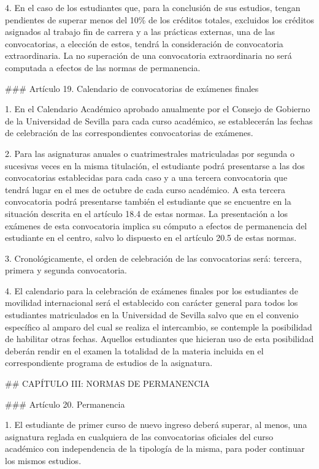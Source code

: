 \documentclass{article}
\begin{document}
\begin{itemize}
\begin{itemize}
\begin{scriptsize}
                  4. En el caso de los estudiantes que, para la conclusión de sus estudios, tengan pendientes de superar menos del 10\% de los créditos totales, excluidos los créditos asignados al trabajo fin de carrera y a las prácticas externas, una de las convocatorias, a elección de estos, tendrá la consideración de convocatoria extraordinaria. La no superación de una convocatoria extraordinaria no será computada a efectos de las normas de permanencia.

                  \#\#\# Artículo 19. Calendario de convocatorias de exámenes finales

                  1. En el Calendario Académico aprobado anualmente por el Consejo de Gobierno de la Universidad de Sevilla para cada curso académico, se establecerán las fechas de celebración de las correspondientes convocatorias de exámenes.

                  2. Para las asignaturas anuales o cuatrimestrales matriculadas por segunda o sucesivas veces en la misma titulación, el estudiante podrá presentarse a las dos convocatorias establecidas para cada caso y a una tercera convocatoria que tendrá lugar en el mes de octubre de cada curso académico. A esta tercera convocatoria podrá presentarse también el estudiante que se encuentre en la situación descrita en el artículo 18.4 de estas normas. La presentación a los exámenes de esta convocatoria implica su cómputo a efectos de permanencia del estudiante en el centro, salvo lo dispuesto en el artículo 20.5 de estas normas.

                  3. Cronológicamente, el orden de celebración de las convocatorias será: tercera, primera y segunda convocatoria.

                  4. El calendario para la celebración de exámenes finales por los estudiantes de movilidad internacional será el establecido con carácter general para todos los estudiantes matriculados en la Universidad de Sevilla salvo que en el convenio específico al amparo del cual se realiza el intercambio, se contemple la posibilidad de habilitar otras fechas. Aquellos estudiantes que hicieran uso de esta posibilidad deberán rendir en el examen la totalidad de la materia incluida en el correspondiente programa de estudios de la asignatura.

                  \#\# CAPÍTULO III: NORMAS DE PERMANENCIA

                  \#\#\# Artículo 20. Permanencia

                  1. El estudiante de primer curso de nuevo ingreso deberá superar, al menos, una asignatura reglada en cualquiera de las convocatorias oficiales del curso académico con independencia de la tipología de la misma, para poder continuar los mismos estudios.


\end{scriptsize}
\end{itemize}
\end{itemize}
\end{document}
